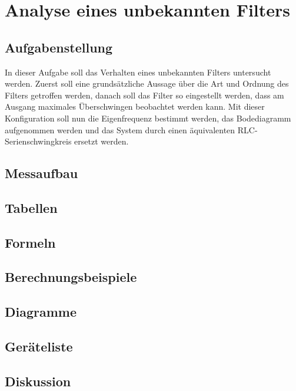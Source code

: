\documentclass[12pt,a4paper,ngerman]{article}
\begin{document}


%
%

\section{Analyse eines unbekannten Filters}
\subsection{Aufgabenstellung}
In dieser Aufgabe soll das Verhalten eines unbekannten Filters untersucht werden. Zuerst soll eine grundsätzliche Aussage über die Art und Ordnung des Filters getroffen werden, danach soll das Filter so eingestellt werden, dass am Ausgang maximales Überschwingen beobachtet werden kann. 
Mit dieser Konfiguration soll nun die Eigenfrequenz bestimmt werden, das Bodediagramm aufgenommen werden und das System durch einen äquivalenten RLC-Serienschwingkreis ersetzt werden.

\subsection{Messaufbau}

\subsection{Tabellen}

\subsection{Formeln}

\subsection{Berechnungsbeispiele}

\subsection{Diagramme}

\subsection{Geräteliste}

\subsection{Diskussion}
\end{document}

